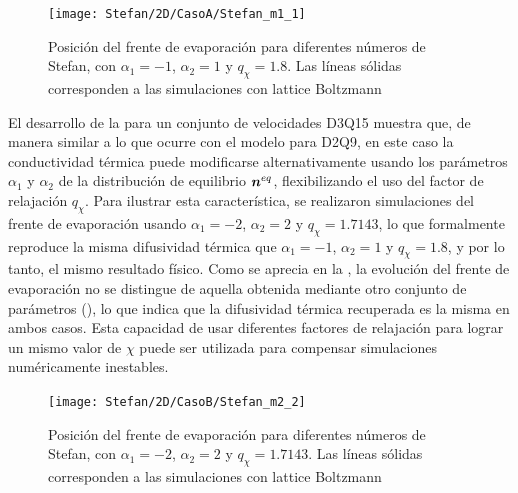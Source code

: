 \begin{figure}[ht]
	\centering
	\texttt{[image: Stefan/2D/CasoA/Stefan\_m1\_1]}
	\caption{Posici\'on del frente de evaporaci\'on para diferentes n\'umeros de Stefan, con $\alpha_1 = -1$, $\alpha_2=1$ y $q_{\chi} = 1.8$. Las l\'ineas s\'olidas corresponden a las simulaciones con lattice Boltzmann}
	\label{fig:Stefan_m1_1_3D}
\end{figure}

El desarrollo de la \lbe{} para un conjunto de velocidades D3Q15 muestra que, de manera similar a lo que ocurre con el modelo para D2Q9, en este caso la conductividad t\'ermica puede modificarse alternativamente usando los par\'ametros $\alpha_1$ y $\alpha_2$ de la distribuci\'on de equilibrio $\bm{n}^{eq}$, flexibilizando el uso del factor de relajaci\'on $q_{\chi}$. Para ilustrar esta caracter\'istica, se realizaron simulaciones del frente de evaporaci\'on usando $\alpha_1=-2$, $\alpha_2=2$ y $q_{\chi}=1.7143$, lo que formalmente reproduce la misma difusividad t\'ermica que $\alpha_1=-1$, $\alpha_2=1$ y $q_{\chi}=1.8$, y por lo tanto, el mismo resultado f\'isico. Como se aprecia en la , la evoluci\'on del frente de evaporaci\'on no se distingue de aquella obtenida mediante otro conjunto de par\'ametros (), lo que indica que la difusividad t\'ermica recuperada es la misma en ambos casos. Esta capacidad de usar diferentes factores de relajaci\'on para lograr un mismo valor de $\chi$ puede ser utilizada para compensar simulaciones num\'ericamente inestables.

\begin{figure}[ht]
	\centering
	\texttt{[image: Stefan/2D/CasoB/Stefan\_m2\_2]}
	\caption{Posici\'on del frente de evaporaci\'on para diferentes n\'umeros de Stefan, con $\alpha_1 = -2$, $\alpha_2=2$ y $q_{\chi} = 1.7143$. Las l\'ineas s\'olidas corresponden a las simulaciones con lattice Boltzmann}
	\label{fig:Stefan_m2_2_3D}
\end{figure}
